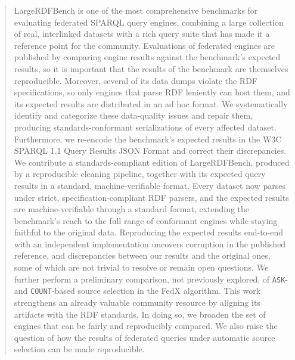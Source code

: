 \begin{abstract}
	LargeRDFBench is one of the most comprehensive benchmarks for evaluating federated SPARQL
	query engines, combining a large collection of real, interlinked datasets with a rich query
	suite that has made it a reference point for the community.
	Evaluations of federated engines are published by comparing engine results against the benchmark's expected results, so it is important that the results of the benchmark are themselves reproducible.
	Moreover, several of its data dumps violate the RDF specifications, so only engines that parse RDF leniently can host them, and its expected results are distributed in an ad hoc format.
	We systematically identify and categorize these data-quality issues and repair them,
	producing standards-conformant serializations of every affected dataset.
	Furthermore, we re-encode the benchmark's expected results in the W3C SPARQL 1.1 Query Results JSON Format and correct their discrepancies.
	We contribute a standards-compliant edition of LargeRDFBench, produced by a
	reproducible cleaning pipeline, together with its expected query results in a standard,
	machine-verifiable format.
	Every dataset now parses under strict, specification-compliant RDF parsers, and the expected
	results are machine-verifiable through a standard format, extending the benchmark's reach to
	the full range of conformant engines while staying faithful to the original data.
	Reproducing the expected results end-to-end with an independent implementation uncovers corruption in the published reference, and discrepancies between our results and the original ones, some of which are not trivial to resolve or remain open questions.
	We further perform a preliminary comparison, not previously explored, of \texttt{ASK}- and
	\texttt{COUNT}-based source selection in the FedX algorithm.
	This work strengthens an already valuable community resource by aligning its artifacts with the RDF standards.
	In doing so, we broaden the set of engines that can be fairly and reproducibly compared.
	We also raise the question of how the results of federated queries under automatic source selection can be made reproducible.
\end{abstract}
